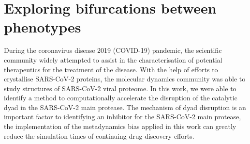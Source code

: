 \chapter{Exploring bifurcations between phenotypes}
\label{chapter:exploring}


During the coronavirus disease 2019 (COVID-19) pandemic, the scientific community widely attempted to assist in the characterisation of potential therapeutics for the treatment of the disease. With the help of efforts to crystallise SARS-CoV-2 proteins, the molecular dynamics community was able to study structures of SARS-CoV-2 viral proteome. In this work, we were able to identify a method to computationally accelerate the disruption of the catalytic dyad in the SARS-CoV-2 main protease. The mechanism of dyad disruption is an important factor to identifying an inhibitor for the SARS-CoV-2 main protease, the implementation of the metadynamics bias applied in this work can greatly reduce the simulation times of continuing drug discovery efforts. 

%
\clearpage

